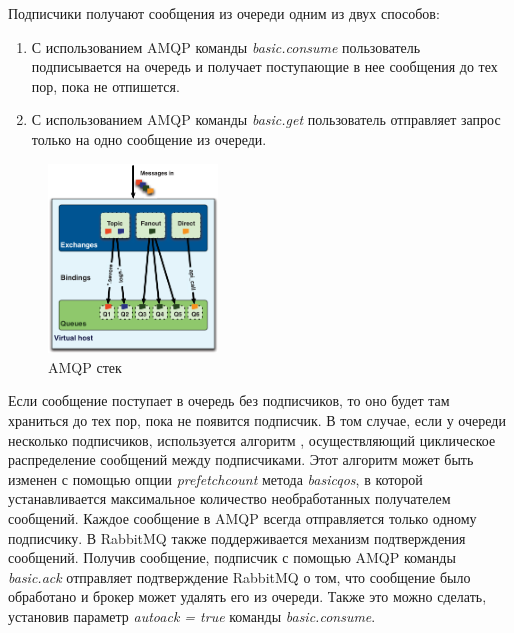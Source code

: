 Подписчики получают сообщения из очереди одним из двух способов:
\begin{enumerate}
  \item С использованием AMQP команды \textit{basic.consume} пользователь подписывается на очередь и получает поступающие в нее сообщения до тех пор, пока не отпишется. 
  \item С использованием AMQP команды \textit{basic.get} пользователь отправляет запрос только на одно сообщение из очереди. 
\end{enumerate}
\begin{figure}
\centering
\includegraphics[width=0.4\textwidth]{img/queues.png}
\caption{AMQP стек}
\end{figure}
Если сообщение поступает в очередь без подписчиков, то оно будет там храниться до тех пор, пока не появится подписчик. В том случае, если у очереди несколько подписчиков, используется алгоритм , осуществляющий циклическое распределение сообщений между подписчиками. Этот алгоритм может быть изменен с помощью опции \textit{prefetch\underline{\hspace{0.25cm}}count} метода \textit{basic\underline{\hspace{0.25cm}}qos}, в которой устанавливается максимальное количество необработанных получателем сообщений. Каждое сообщение в AMQP всегда отправляется только одному подписчику. В RabbitMQ также поддерживается механизм подтверждения сообщений. Получив сообщение, подписчик с помощью AMQP команды  \textit{basic.ack} отправляет подтверждение RabbitMQ о том, что сообщение было обработано и брокер может удалять его из очереди. Также это можно сделать, установив параметр  \textit{auto\underline{\hspace{0.25cm}}ack = true} команды \textit{basic.consume}.

